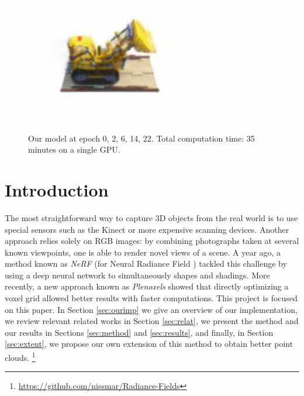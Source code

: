 \documentclass{article}
\begin{document}
\begin{figure}[!h]
\begin{subfigure}{.19\textwidth}
\end{subfigure}
\begin{subfigure}{.19\textwidth}
  \centering
  \includegraphics[width=\linewidth]{figs/model32.png}  
\end{subfigure}
     \caption{Our model at epoch {0, 2, 6, 14, 22}. Total computation time: 35 minutes on a single GPU.}
    \label{fig:lego_optim}
\end{figure}


\begin{abstract}
\lipsum[1]
\cite{plenoxels}
\cite{nerf}
\cite{spacecarving}
\cite{directvoxgo}
\cite{instant}
\end{abstract}


\section{Introduction}

The most straightforward way to capture 3D objects from the real world is to use special sensors such as the Kinect or more expensive scanning devices. Another approach relies solely on RGB images: by combining photographs taken at several known viewpoints, one is able to render novel views of a scene. A year ago, a method known as \textit{NeRF} (for Neural Radiance Field \cite{nerf}) tackled this challenge by using a deep neural network to simultaneously shapes and shadings. More recently, a new approach known as \textit{Plenoxels} \cite{plenoxels} showed that directly optimizing a voxel grid allowed better results with faster computations. This project is focused on this paper. In Section \ref{sec:ourimp} we give an overview of our implementation, we review relevant related works in Section \ref{sec:relat}, we present the method and our results in Sections \ref{sec:method} and \ref{sec:results}, and finally, in Section \ref{sec:extent}, we propose our own extension of this method to obtain better point clouds.
\footnote{\url{https://github.com/nissmar/Radiance-Fields}}
\end{document}
